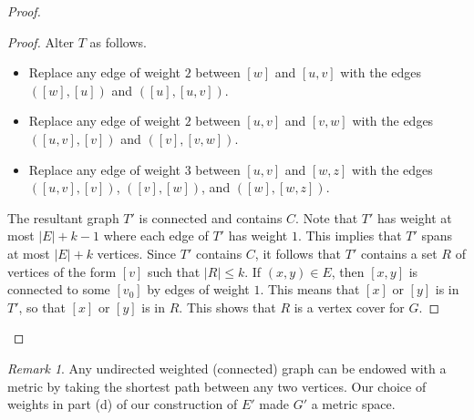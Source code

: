 \documentclass[10pt,letterpaper,cm]{nupset}
\theoremstyle{definition}
\theoremstyle{theorem}
\theoremstyle{remark}
\newtheorem{remark}[definition]{Remark}
\newcommand{\1}{\mathbf{1}}
\newcommand{\0}{\vec 0}
\begin{document}
\begin{proof}
\begin{proof}
Alter $T$ as follows.
\begin{itemize}
\item Replace any edge of weight $2$ between $[w]$ and $[u,v]$ with the edges $([w], [u])$ and $([u], [u,v])$.
\item Replace any edge of weight $2$ between $[u,v]$ and $[v,w]$ with the edges $([u,v], [v])$ and $([v], [v,w])$.
\item Replace any edge of weight $3$ between $[u,v]$ and $[w,z]$ with the edges $([u,v], [v])$, $([v], [w])$, and $([w], [w,z])$.
\end{itemize}
The resultant graph $T'$ is connected and contains $C$. Note that $T'$ has weight at most $|E| + k -1$ where each edge of $T'$ has weight $1$. This implies that $T'$ spans at most $|E| +k$ vertices. Since $T'$ contains $C$, it follows that $T'$ contains a set $R$ of vertices of the form $[v]$ such that $|R|\leq k$. If $(x,y)\in E$, then $[x,y]$ is connected to some $[v_0]$ by edges of weight $1$. This means that $[x]$ or $[y]$ is in $T'$, so that $[x]$ or $[y]$ is in $R$. This shows that $R$ is a vertex cover for $G$.
\end{proof}
\end{proof}

\begin{remark}
Any undirected  weighted (connected) graph can be endowed with a metric by taking the shortest path between any two vertices. Our choice of weights in part (d) of our construction of $E'$ made $G'$ a metric space. 
\end{remark}
\end{document}
